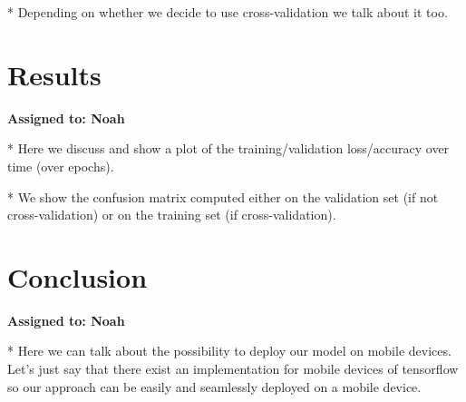 \documentclass{article}
\begin{document}
* Depending on whether we decide to use cross-validation we talk about it too.


\section{Results}
\vspace{-.3cm}
\textbf{Assigned to: Noah}

* Here we discuss and show a plot of the training/validation loss/accuracy over time (over epochs).

* We show the confusion matrix computed either on the validation set (if not cross-validation) or
on the training set (if cross-validation).


\section{Conclusion}
\vspace{-.3cm}
\textbf{Assigned to: Noah}

* Here we can talk about the possibility to deploy our model on mobile devices. Let's just say that
there exist an implementation for mobile devices of tensorflow so our approach can be easily and
seamlessly deployed on a mobile device.
\end{document}
